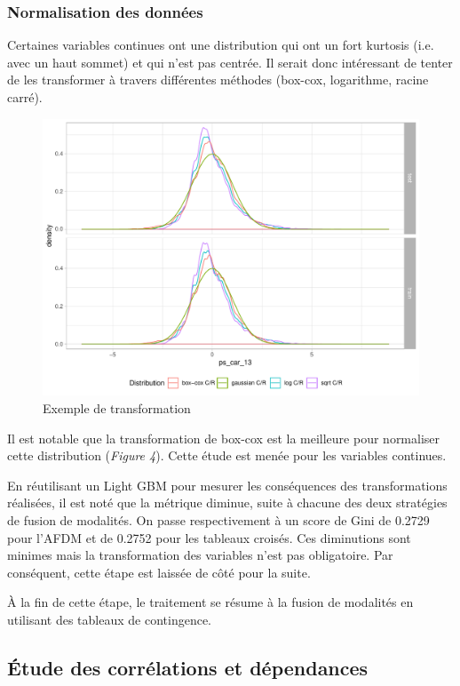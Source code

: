 \documentclass[french]{article}
\begin{document}
\begin{multicols}{2}
\subsubsection{Normalisation des données}

Certaines variables continues ont une distribution qui ont un fort kurtosis (i.e. avec un haut sommet) et qui n'est pas centrée. Il serait donc intéressant de tenter de les transformer à travers différentes méthodes (box-cox, logarithme, racine carré).

\begin{figure}[H] \centering
  \includegraphics[width = 0.99\columnwidth]{img/ex_normalisation}
  \caption{Exemple de transformation}
\end{figure}

Il est notable que la transformation de box-cox est la meilleure pour normaliser cette distribution (\emph{Figure 4}). Cette étude est menée pour les variables continues.

En réutilisant un Light GBM pour mesurer les conséquences des transformations réalisées, il est noté que la métrique diminue, suite à chacune des deux stratégies de fusion de modalités. On passe respectivement à un score de Gini de 0.2729 pour l'AFDM et de 0.2752 pour les tableaux croisés. Ces diminutions sont minimes mais la transformation des variables n'est pas obligatoire. Par conséquent, cette étape est laissée de côté pour la suite. 

À la fin de cette étape, le traitement se résume à la fusion de modalités en utilisant des tableaux de contingence.

\subsection{Étude des corrélations et dépendances}


\end{multicols}
\end{document}
